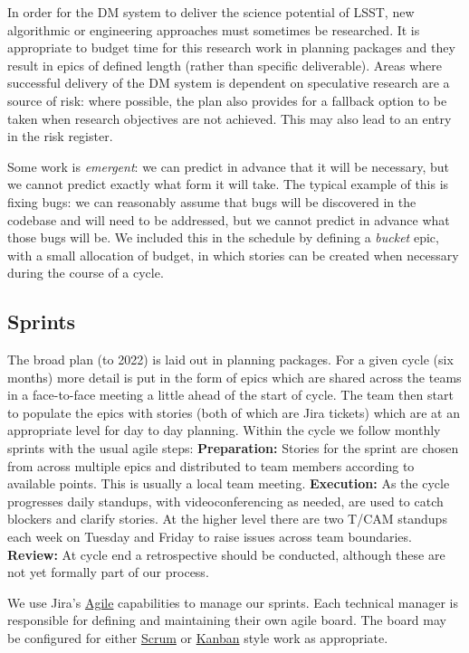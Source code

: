 In order for the DM system to deliver the science potential of LSST, new algorithmic or engineering approaches must sometimes be researched.
It is appropriate to budget time for this research work in planning packages and they result in epics of defined length (rather than specific  deliverable).
Areas where successful delivery of the DM system is dependent on speculative research are a source of risk: where possible, the plan  also provides for a fallback option to be taken when research objectives are not achieved.
This may also lead to an entry in the risk register.\cite{2016SPIE.9911E..0NK}


Some work is \emph{emergent}: we can predict in advance that it will be necessary, but we cannot
predict exactly what form it will take. The typical example of this is fixing bugs: we can reasonably
assume that bugs will be discovered in the codebase and will need to be addressed,
but we cannot predict in advance what those bugs will be.
We included this in the schedule by defining a \emph{bucket} epic, with a small allocation of budget, in which stories can be created
when necessary during the course of a cycle.

\subsection{Sprints} \label{sec:sprint} \label{sec:jira_ticket}
The broad plan (to 2022) is laid out in planning packages.
For a  given  cycle (six months)   more detail is put in the form of epics which  are shared across the teams in a face-to-face meeting a little ahead of the start of cycle.  The team then start to populate the epics with stories (both of which are Jira tickets)  which are at an appropriate level for day to day planning.
Within the cycle we follow monthly sprints with the usual agile steps:
\textbf{Preparation:} Stories for the sprint are chosen from across multiple epics and distributed to team members according to available points. This is usually a local team meeting. \textbf{Execution:} As the cycle progresses daily standups, with videoconferencing as needed,  are used to catch blockers and clarify stories. At the higher level there are two T/CAM standups each week on Tuesday and Friday to raise issues across team boundaries. \textbf{Review:} At cycle end a retrospective should be conducted, although these are not yet formally part of our process.

We use Jira's
\href{https://www.atlassian.com/software/jira/agile}{Agile} capabilities
to manage our sprints. Each technical manager is responsible for
defining and maintaining their own agile board. The board may be
configured for either
\href{https://en.wikipedia.org/wiki/Scrum_(software_development)}{Scrum}
or \href{https://en.wikipedia.org/wiki/Kanban_(development)}{Kanban}
style work as appropriate.

